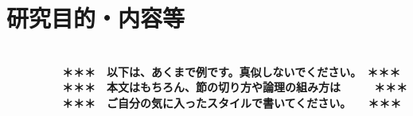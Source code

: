 \documentclass[11pt,a4j,dvipdfmx]{jarticle} 					%
\newcommand{\研究課題名}{象の卵}
\newcommand{\研究機関名}{逢坂大学}
\newcommand{\研究代表者氏名}{湯川秀樹}
\begin{document}



\section{研究目的・内容等}

\JSPSInstructions		%
\textbf{\\　　　　　＊＊＊　以下は、あくまで例です。真似しないでください。　＊＊＊\\
　　　　　＊＊＊　本文はもちろん、節の切り方や論理の組み方は　　　＊＊＊\\
　　　　　＊＊＊　ご自分の気に入ったスタイルで書いてください。　　＊＊＊}
\end{document}
